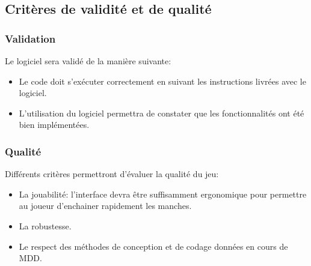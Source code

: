 \documentclass{scrartcl}
\begin{document}
	\subsection{Critères de validité et de qualité}
		\subsubsection{Validation}
		Le logiciel sera validé de la manière suivante:
  			\begin{itemize}
  			 	\item Le code doit s'exécuter correctement en suivant les instructions livrées avec le logiciel.
  			 	\item L'utilisation du logiciel permettra de constater que les fonctionnalités ont été bien implémentées.
  			\end{itemize}
		\subsubsection{Qualité}
		Différents critères permettront d'évaluer la qualité du jeu:
  			\begin{itemize}
  			 	\item La jouabilité: l'interface devra être suffisamment ergonomique pour permettre au joueur d'enchainer rapidement les manches.
  			 	\item La robustesse.
  			 	\item Le respect des méthodes de conception et de codage données en cours de MDD.
  			\end{itemize}
\end{document}
